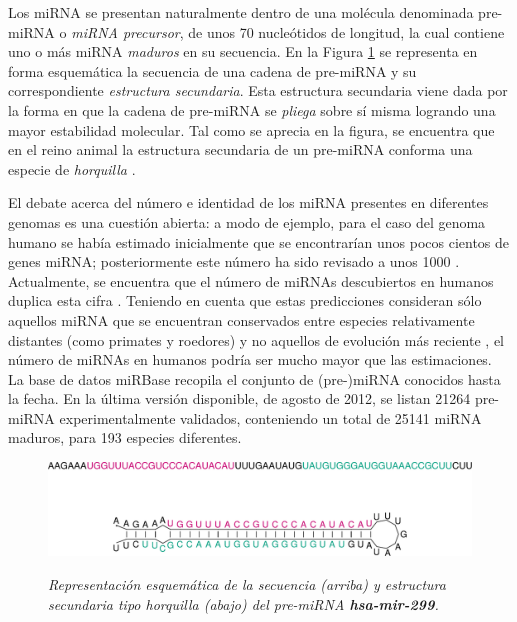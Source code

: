 \documentclass[12pt,bibliography=oldstyle,DIV=12,parskip=full-,titlepage]{scrartcl}
\begin{document}
Los miRNA se presentan naturalmente dentro de una molécula denominada
pre-miRNA o \emph{miRNA precursor}, de unos 70 nucleótidos de
longitud, la cual contiene uno o más miRNA \emph{maduros} en su
secuencia. En la Figura \ref{horquilla} se representa en forma
esquemática la secuencia de una cadena de pre-miRNA y su
correspondiente \emph{estructura secundaria}. Esta estructura
secundaria viene dada por la forma en que la cadena de pre-miRNA se
\emph{pliega} sobre sí misma logrando una mayor estabilidad
molecular. Tal como se aprecia en la figura, se encuentra que en el
reino animal la estructura secundaria de un pre-miRNA conforma una
especie de \emph{horquilla} \cite{bartel116}\cite{sewer}.

\newpage
El debate acerca del número e identidad de los miRNA presentes en
diferentes genomas es una cuestión abierta: a modo de ejemplo, para el
caso del genoma humano se había estimado inicialmente que se
encontrarían unos pocos cientos de genes miRNA; posteriormente este
número ha sido revisado a unos 1000 \cite{sewer}\cite{chang}.
Actualmente, se encuentra que el número de miRNAs descubiertos en
humanos duplica esta cifra \cite{gomes}.  Teniendo en cuenta que estas
predicciones consideran sólo aquellos miRNA que se encuentran
conservados entre especies relativamente distantes (como primates y
roedores) y no aquellos de evolución más reciente \cite{sewer}, el
número de miRNAs en humanos podría ser mucho mayor que las
estimaciones. La base de datos miRBase \cite{mirbase2}\cite{mirbase3}
recopila el conjunto de (pre-)miRNA conocidos hasta la
fecha. En la última versión disponible, de agosto de 2012, se listan
21264 pre-miRNA experimentalmente validados, conteniendo un total de
25141 miRNA maduros, para 193 especies diferentes.
%
\begin{figure}
  \small\slshape\center
  \includegraphics[width=.9\textwidth]{res/hsa-mir-299_ss.pdf}
  \caption{\small\slshape Representación esquemática de la secuencia
    (arriba) y estructura secundaria tipo horquilla (abajo) del
    pre-miRNA \textbf{hsa-mir-299}.  }
  \label{horquilla}
\end{figure}
\end{document}
